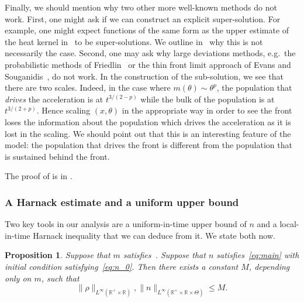 \documentclass[11pt]{article}    %
\newcommand{\EB}[1]{\textcolor{blue}{#1}}
\newtheorem{prop}[theorem]{Proposition}
\newcommand{\R}{\mathbb{R}}
\begin{document}
Finally, we should mention why two other more well-known methods do not work.  First, one might ask if we can construct an explicit super-solution.  For example, one might expect functions of the same form as the upper estimate of the heat kernel in~\cite{LiYau} to be super-solutions. We outline in~ why this is not necessarily the case. %
Second, one may ask why large deviations methods, e.g.~the probabilistic methods of Friedlin~\cite{Freidlin1, Freidlin2} or the thin front limit approach of Evans and Souganidis~\cite{EvansSouganidis}, do not work.  In the construction of the sub-solution, we see that there are two scales.  Indeed, in the case where $m(\theta) \sim \theta^p$, the population that {\em drives} the acceleration is at $t^{3/(2-p)}$ while the bulk of the population is at $t^{3/(2+p)}$.  Hence scaling $(x,\theta)$ in the appropriate way in order to see the front loses the information about the population which drives the acceleration as it is lost in the scaling.  We should point out that this is an interesting feature of the model: the population that drives the front is different from the population that is sustained behind the front.

The proof of  is in .




%
%



\subsubsection*{A Harnack estimate and a uniform upper bound}

Two key tools in our analysis are a uniform-in-time upper bound of $n$ and a local-in-time Harnack inequality that we can deduce from it.  We state both now.

\begin{prop}\label{prop:uniform_upper_bound}
	Suppose that $m$ satisfies~.  Suppose that $n$ satisfies~\eqref{eq:main} with initial condition satisfying~\eqref{eq:n_0}.  Then there exists a constant $M$, depending only on $m$, such that
	\[
		\|\rho\|_{L^\infty(\R^+\times \R)}, \|n \|_{L^\infty(\R^+\times \R \times \Theta)} \leq M.
	\]
\end{prop}
\end{document}
